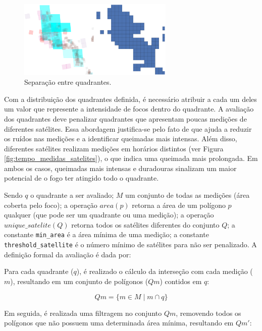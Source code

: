 \documentclass[cic,tc]{iiufrgs}
\begin{document}
\begin{figure}[!htb]
    \caption{Separação entre quadrantes.}
    \begin{center}
        \includegraphics[width=20em]{satellite_quads_split}
    \end{center}
    \label{fig:satellite_quads_split}
\end{figure}

Com a distribuição dos quadrantes definida, é necessário atribuir a cada um deles um valor que represente a intensidade de focos dentro do quadrante. A avaliação dos quadrantes deve penalizar quadrantes que apresentam poucas medições de diferentes satélites. Essa abordagem justifica-se pelo fato de que ajuda a reduzir os ruídos nas medições e a identificar queimadas mais intensas. Além disso, diferentes satélites realizam medições em horários distintos (ver Figura \ref{fig:tempo_medidas_satelites}), o que indica uma queimada mais prolongada. Em ambos os casos, queimadas mais intensas e duradouras sinalizam um maior potencial de o fogo ter atingido todo o quadrante.

Sendo $q$ o quadrante a ser avaliado; $M$ um conjunto de todas as medições (área coberta pelo foco); a operação $area(p)$ retorna a área de um polígono $p$ qualquer (que pode ser um quadrante ou uma medição); a operação $unique\_satelite(Q)$ retorna todos os satélites diferentes do conjunto $Q$; a constante \texttt{min\_area} é a área mínima de uma medição; a constante \texttt{threshold\_satellite} é o número mínimo de satélites para não ser penalizado. A definição formal da avaliação é dada por: \par

Para cada quadrante ($q$), é realizado o cálculo da interseção com cada medição ($m$), resultando em um conjunto de polígonos ($Qm$) contidos em $q$:

\begin{equation} \label{eqn:def_qm}
Qm = \{ m \in M \mid m \cap q \}
\end{equation}

Em seguida, é realizada uma filtragem no conjunto $Qm$, removendo todos os polígonos que não possuem uma determinada área mínima, resultando em $Qm'$:
\end{document}
